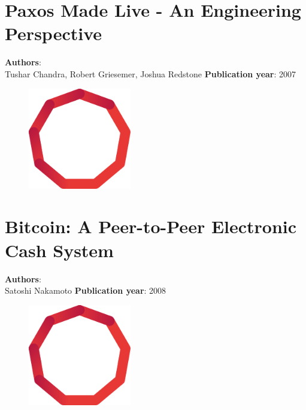 \documentclass[11pt,fleqn]{book} %
\begin{document}
\chapter{Paxos Made Live - An Engineering Perspective}
\vspace*{-7mm}
\Large \textbf{Authors}: \\
Tushar Chandra, Robert Griesemer, Joshua Redstone
\newline\newline
\textbf{Publication year}: 2007
\begin{figure}[b]
    \centering
    \includegraphics[width=0.4\textwidth]{distributed-systems-red.pdf}
\end{figure}


\chapter{Bitcoin: A Peer-to-Peer Electronic Cash System}
\vspace*{-7mm}
\Large \textbf{Authors}: \\
Satoshi Nakamoto
\newline\newline
\textbf{Publication year}: 2008
\begin{figure}[b]
    \centering
    \includegraphics[width=0.4\textwidth]{distributed-systems-red.pdf}
\end{figure}


\pagecolor{red}\afterpage{}
\newpage\null\thispagestyle{empty}\newpage
\end{document}

